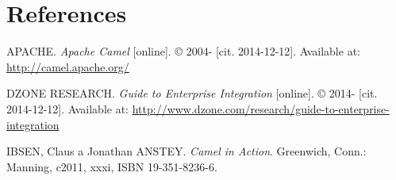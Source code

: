 \documentclass[12pt,final,oneside]{fithesis2}
\begin{document}
  



\begingroup
\def\tmpchapter{0}
\renewcommand{\chaptername}{}
\renewcommand{\thechapter}{}
\chapter{References}
\renewcommand{\chapter}[2]{}%




\begin{thebibliography}{}
	 APACHE. \textit{Apache Camel} [online]. \copyright{} 2004- [cit. 2014-12-12]. Available at: \url{http://camel.apache.org/}
	
		 DZONE RESEARCH. \textit{Guide to Enterprise Integration} [online]. \copyright{} 2014- [cit. 2014-12-12]. Available at: \url{http://www.dzone.com/research/guide-to-enterprise-integration}
	
	 IBSEN, Claus a Jonathan ANSTEY. \textit{Camel in Action}. Greenwich, Conn.: Manning, c2011, xxxi, ISBN 19-351-8236-6.
	
\end{thebibliography}

\endgroup
\appendix

\end{document}
